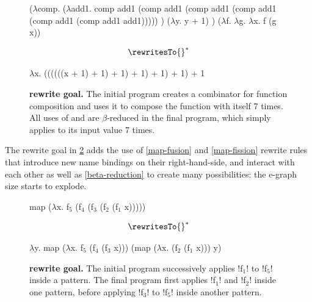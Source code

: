 \begin{figure}[b]
\begin{rise}
($\lambda$comp.
  ($\lambda$add1.
    comp add1 (comp add1 (comp add1 (comp add1 (comp add1 (comp add1 add1)))))
  ) ($\lambda$y. y + 1)
) ($\lambda$f. $\lambda$g. $\lambda$x. f (g x))
\end{rise}
$$ \rewritesTo{}^* $$
\begin{rise}
$\lambda$x. ((((((x + 1) + 1) + 1) + 1) + 1) + 1) + 1
\end{rise}
\caption{\textbf{\reductionGoal{} rewrite goal.}
The initial program creates a  combinator for function composition and uses it to compose the  function with itself 7 times.
All uses of  and  are $\beta$-reduced in the final program, which simply applies  to its input value 7 times.}
\label{fig:reduction-rewrite}
\end{figure}

\def\fission {\goalStyle{fission}}
The \fission{} rewrite goal in \cref{fig:fission-rewrite} adds the use of \ref{map-fusion} and \ref{map-fission} rewrite rules that introduce new name bindings on their right-hand-side, and interact with each other as well as \ref{beta-reduction} to create many possibilities: the e-graph size starts to explode.

\begin{figure}[b]
\begin{rise}
map ($\lambda$x. f$_5$ (f$_4$ (f$_3$ (f$_2$ (f$_1$ x)))))
\end{rise}
$$ \rewritesTo{}^* $$
\begin{rise}
$\lambda$y. map ($\lambda$x. f$_5$ (f$_4$ (f$_3$ x))) (map ($\lambda$x. (f$_2$ (f$_1$ x))) y)
\end{rise}
\caption{\textbf{\fission{} rewrite goal.}
The initial program successively applies \inlineRise!f$_1$! to \inlineRise!f$_5$! inside a  pattern.
The final program first applies \inlineRise!f$_1$! and \inlineRise!f$_2$! inside one  pattern, before applying \inlineRise!f$_3$! to \inlineRise!f$_5$! inside another  pattern.}
\label{fig:fission-rewrite}
\end{figure}

